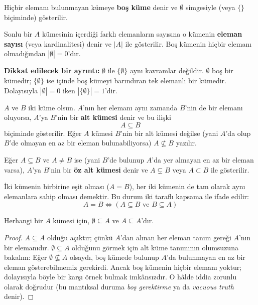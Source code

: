 \begin{definition}
Hiçbir elemanı bulunmayan kümeye \textbf{boş küme} denir ve $\emptyset$ simgesiyle (veya $\{\}$ biçiminde) gösterilir. 

Sonlu bir $A$ kümesinin içerdiği farklı elemanların sayısına o kümenin \textbf{eleman sayısı} (veya kardinalitesi) denir ve $|A|$ ile gösterilir. Boş kümenin hiçbir elemanı olmadığından $|\emptyset| = 0$'dır.
\end{definition}

\textbf{Dikkat edilecek bir ayrıntı:} $\emptyset$ ile $\{\emptyset\}$ aynı kavramlar değildir. $\emptyset$ boş bir kümedir; $\{\emptyset\}$ ise içinde boş kümeyi barındıran tek elemanlı bir kümedir. Dolayısıyla $|\emptyset| = 0$ iken $|\{\emptyset\}| = 1$'dir.

\begin{definition}
$A$ ve $B$ iki küme olsun. $A$'nın her elemanı aynı zamanda $B$'nin de bir elemanı oluyorsa, $A$'ya $B$'nin bir \textbf{alt kümesi} denir ve bu ilişki
\[ A \subseteq B \]
biçiminde gösterilir. Eğer $A$ kümesi $B$'nin bir alt kümesi değilse (yani $A$'da olup $B$'de olmayan en az bir eleman bulunabiliyorsa) $A \nsubseteq B$ yazılır.

Eğer $A \subseteq B$ ve $A \neq B$ ise (yani $B$'de bulunup $A$'da yer almayan en az bir eleman varsa), $A$'ya $B$'nin bir \textbf{öz alt kümesi} denir ve $A \subsetneq B$ veya $A \subset B$ ile gösterilir.

İki kümenin birbirine eşit olması ($A = B$), her iki kümenin de tam olarak aynı elemanlara sahip olması demektir. Bu durum iki taraflı kapsama ile ifade edilir:
\[ A = B \iff (A \subseteq B \text{ ve } B \subseteq A) \]
\end{definition}

\begin{lemma}
Herhangi bir $A$ kümesi için, $\emptyset \subseteq A$ ve $A \subseteq A$'dır.
\end{lemma}
\begin{proof}
$A \subseteq A$ olduğu açıktır; çünkü $A$'dan alınan her eleman tanım gereği $A$'nın bir elemanıdır. $\emptyset \subseteq A$ olduğunu görmek için alt küme tanımının olumsuzuna bakalım: Eğer $\emptyset \nsubseteq A$ olsaydı, boş kümede bulunup $A$'da bulunmayan en az bir eleman gösterebilmemiz gerekirdi. Ancak boş kümenin hiçbir elemanı yoktur; dolayısıyla böyle bir karşı örnek bulmak imkânsızdır. O hâlde iddia zorunlu olarak doğrudur (bu mantıksal duruma \textit{boş gerektirme} ya da \textit{vacuous truth} denir).
\end{proof}

